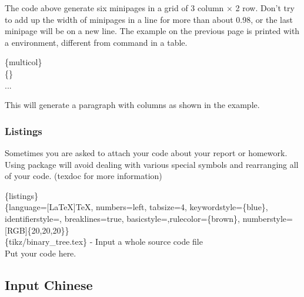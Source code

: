 \begin{frame}
	The code above generate six minipages in a grid of 3 column $\times$ 2 row. Don't try to add up the width of minipages in a line for more than about 0.98, or the last minipage will be on a new line.
	The example on the previous page is printed with a   environment, different from  command in a table.
	\begin{command}
		\{multicol\}\\
		\{\}\\
		\qquad ...\\
	\end{command}
	This will generate a paragraph with  columns as shown in the example.	
\end{frame}

\begin{frame}
	\frametitle{Listings}
	Sometimes you are asked to attach your code about your report or homework. Using  package will avoid dealing with various special symbols and rearranging all of your code. (\alert{texdoc}  for more information)
	\begin{example}
		\{listings\}\\
		\{language=[LaTeX]TeX, numbers=left, tabsize=4, keywordstyle=\{blue\}, identifierstyle=, breaklines=true, basicstyle=,rulecolor=\{brown\}, numberstyle=[RGB]\{20,20,20\}\}\\
		\{tikz/binary\_tree.tex\} - Input a whole source code file
		\\
		Put your code here.\\
	\end{example} 
\end{frame}

\subsection{Input Chinese}

